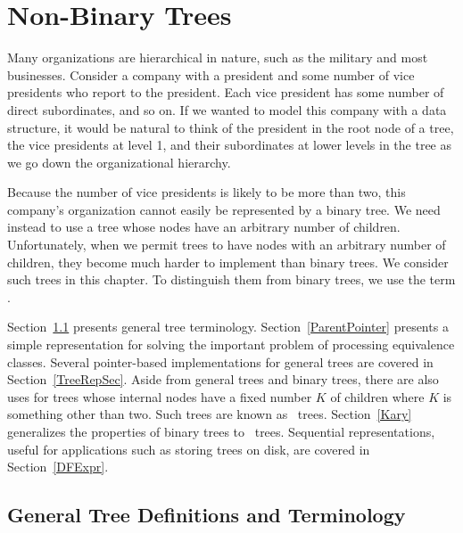 
\chapter{Non-Binary Trees}
\label{GeneralTree}
\def\CHHEAD{Chap.\ \thechapter\ Non-Binary Trees}    %

Many organizations are hierarchical in nature, such as the military
and most businesses.
Consider a company with a president and some number of vice presidents
who report to the president.
Each vice president has some number of direct subordinates, and so on.
If we wanted to model this company with a data structure,
it would be natural to think of the president
in the root node of a tree, the vice presidents at level 1, and their
subordinates at lower levels in the tree as we go
down the organizational hierarchy.

Because the number of vice presidents is likely to be more than two,
this company's organization cannot easily be represented by a
binary tree.
We need instead to use a tree whose nodes have an arbitrary
number of children.
Unfortunately, when we permit trees to have nodes with an arbitrary
number of children, they become much harder to implement than binary
trees.
We consider such trees in this chapter.
To distinguish them from binary trees,
we use the term .

Section~\ref{TreeDef} presents general tree terminology.
Section~\ref{ParentPointer} presents a simple representation for
solving the important problem of processing equivalence
classes.
Several pointer-based implementations for general trees are covered in
Section~\ref{TreeRepSec}.
Aside from general trees and binary trees, there are also uses for
trees whose internal nodes have a fixed number \(K\) of
children where \(K\) is something other than two.
Such trees are known as \Kary\ trees.
Section~\ref{Kary} generalizes the properties of
binary trees to \Kary\ trees.
Sequential representations, useful for applications such as storing
trees on disk, are covered in Section~\ref{DFExpr}.

\section{General Tree Definitions and Terminology}
\label{TreeDef}

